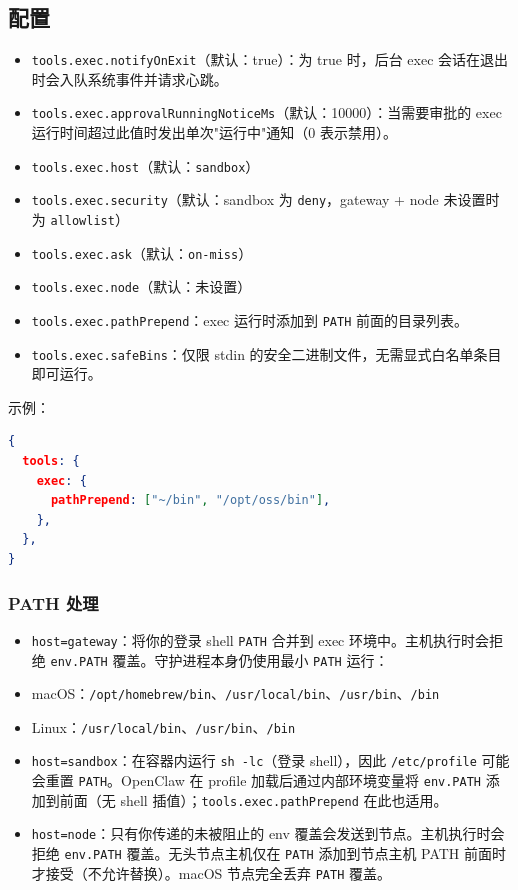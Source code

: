 \subsection{配置}


\begin{itemize}
  \item \texttt{tools.exec.notifyOnExit}（默认：true）：为 true 时，后台 exec 会话在退出时会入队系统事件并请求心跳。
  \item \texttt{tools.exec.approvalRunningNoticeMs}（默认：10000）：当需要审批的 exec 运行时间超过此值时发出单次"运行中"通知（0 表示禁用）。
  \item \texttt{tools.exec.host}（默认：\texttt{sandbox}）
  \item \texttt{tools.exec.security}（默认：sandbox 为 \texttt{deny}，gateway + node 未设置时为 \texttt{allowlist}）
  \item \texttt{tools.exec.ask}（默认：\texttt{on-miss}）
  \item \texttt{tools.exec.node}（默认：未设置）
  \item \texttt{tools.exec.pathPrepend}：exec 运行时添加到 \texttt{PATH} 前面的目录列表。
  \item \texttt{tools.exec.safeBins}：仅限 stdin 的安全二进制文件，无需显式白名单条目即可运行。
\end{itemize}


示例：

\begin{lstlisting}[language=json]
{
  tools: {
    exec: {
      pathPrepend: ["~/bin", "/opt/oss/bin"],
    },
  },
}
\end{lstlisting}


\subsubsection{PATH 处理}


\begin{itemize}
  \item \texttt{host=gateway}：将你的登录 shell \texttt{PATH} 合并到 exec 环境中。主机执行时会拒绝 \texttt{env.PATH} 覆盖。守护进程本身仍使用最小 \texttt{PATH} 运行：
  \item macOS：\texttt{/opt/homebrew/bin}、\texttt{/usr/local/bin}、\texttt{/usr/bin}、\texttt{/bin}
  \item Linux：\texttt{/usr/local/bin}、\texttt{/usr/bin}、\texttt{/bin}
  \item \texttt{host=sandbox}：在容器内运行 \texttt{sh -lc}（登录 shell），因此 \texttt{/etc/profile} 可能会重置 \texttt{PATH}。OpenClaw 在 profile 加载后通过内部环境变量将 \texttt{env.PATH} 添加到前面（无 shell 插值）；\texttt{tools.exec.pathPrepend} 在此也适用。
  \item \texttt{host=node}：只有你传递的未被阻止的 env 覆盖会发送到节点。主机执行时会拒绝 \texttt{env.PATH} 覆盖。无头节点主机仅在 \texttt{PATH} 添加到节点主机 PATH 前面时才接受（不允许替换）。macOS 节点完全丢弃 \texttt{PATH} 覆盖。
\end{itemize}


